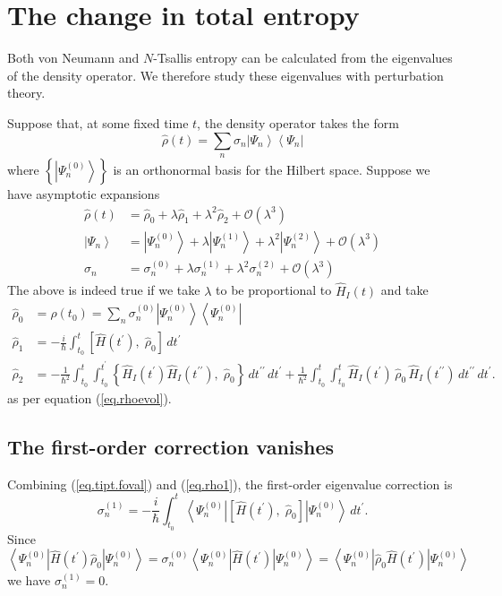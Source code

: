 \documentclass[11pt]{article}
\newcommand{\Od}[1]{\mathcal{O}{\left(#1\right)}}
\newcommand{\bra}[1]{\left\langle#1\right|}
\newcommand{\ket}[1]{\left|#1\right\rangle}
\newcommand{\op}[1]{\hat{#1}}
\theoremstyle{theorem}
\theoremstyle{remark}
\theoremstyle{step}
\theoremstyle{gap}
\begin{document}
\section{The change in total entropy}

Both von Neumann and \(N\)-Tsallis entropy can be calculated from the eigenvalues of the density operator. We therefore study these eigenvalues with perturbation theory.

Suppose that, at some fixed time \(t\), the density operator takes the form
\begin{equation}\label{eq.densdecomp}
\op{\rho}(t) = \sum_n \sigma_n \ket{\Psi_n}\bra{\Psi_n}
\end{equation}
where \(\left\{\ket{\Psi_n^{(0)}}\right\}\) is an orthonormal basis for the Hilbert space.
Suppose we have asymptotic expansions
\begin{align*}
\op{\rho}(t) &= \op{\rho}_0 + \lambda \op{\rho}_1 + \lambda^2 \op{\rho}_2 + \Od{\lambda^3} \\
\ket{\Psi_n} &= \ket{\Psi_n^{(0)}} + \lambda \ket{\Psi_n^{(1)}} + \lambda^2 \ket{\Psi_n^{(2)}} + \Od{\lambda^3} \\
\sigma_n &= \sigma_n^{(0)} + \lambda \sigma_n^{(1)} + \lambda^2 \sigma_n^{(2)} + \Od{\lambda^3}
\end{align*}
The above is indeed true if we take \(\lambda\) to be proportional to \(\op{H}_I(t)\) and take
\begin{align}
\label{eq.rho0}\op{\rho}_0 &= \op{\rho}\left(t_0\right) = \sum_n \sigma_n^{(0)} \ket{\Psi_n^{(0)}} \bra{\Psi_n^{(0)}} \\
\label{eq.rho1}\op{\rho}_1 &= -\frac{i}{\hbar} \int_{t_0}^t \left[\op{H}(t^\prime),\; \op{\rho}_0 \right] \,dt^\prime\\
\label{eq.rho2}\op{\rho}_2 &= - \frac{1}{\hbar^2} \int_{t_0}^t \int_{t_0}^{t^\prime} \left\{ \op{H}_I (t^\prime) \op{H}_I(t^{\prime\prime}),\; \op{\rho}_0 \right\}\,dt^{\prime\prime}\,dt^\prime 
+ \frac{1}{\hbar^2} \int_{t_0}^t \int_{t_0}^{t} \op{H}_I (t^\prime) \,\op{\rho}_0\, \op{H}_I (t^{\prime\prime})\,dt^{\prime\prime}\,dt^\prime.
\end{align}
as per equation (\ref{eq.rhoevol}).

\subsection{The first-order correction vanishes}

Combining (\ref{eq.tipt.foval}) and (\ref{eq.rho1}), the first-order eigenvalue correction is
\[
\sigma_n^{(1)} = -\frac{i}{\hbar} \int_{t_0}^t \bra{\Psi_n^{(0)}} \left[\op{H}(t^\prime),\; \op{\rho}_0 \right] \ket{\Psi_n^{(0)}}\,dt^\prime.
\]
Since
\[
\bra{\Psi_n^{(0)}} \op{H}(t^\prime) \op{\rho}_0 \ket{\Psi_n^{(0)}} = 
\sigma_n^{(0)} \bra{\Psi_n^{(0)}} \op{H}(t^\prime) \ket{\Psi_n^{(0)}} =
\bra{\Psi_n^{(0)}} \op{\rho}_0 \op{H}(t^\prime) \ket{\Psi_n^{(0)}}
\]
we have \(\sigma_n^{(1)} = 0\).
\end{document}
